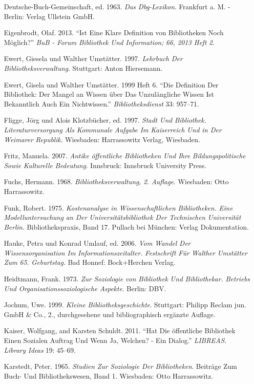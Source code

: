 \documentclass[a4paper,
fontsize=11pt,
oneside,
numbers=noperiodatend,
parskip=half-,
bibliography=totoc,
final
]{scrartcl}
\begin{document}
Deutsche-Buch-Gemeinschaft, ed. 1963. \emph{Das Dbg-Lexikon.} Frankfurt
a. M. - Berlin: Verlag Ullstein GmbH.

Eigenbrodt, Olaf. 2013. \enquote{Ist Eine Klare Definition von
Bibliotheken Noch Möglich?} \emph{BuB - Forum Bibliothek Und
Information; 66, 2013 Heft 2}.

Ewert, Giesela und Walther Umstätter. 1997. \emph{Lehrbuch Der
Bibliotheksverwaltung.} Stuttgart: Anton Hiersemann.

Ewert, Gisela und Walther Umstätter. 1999 Heft 6. \enquote{Die
Definition Der Bibliothek: Der Mangel an Wissen über Das Unzulängliche
Wissen Ist Bekanntlich Auch Ein Nichtwissen.} \emph{Bibliotheksdienst}
33: 957--71.

Fligge, Jörg und Alois Klotzbücher, ed. 1997. \emph{Stadt Und
Bibliothek. Literaturversorgung Als Kommunale Aufgabe Im Kaiserreich Und
in Der Weimarer Republik.} Wiesbaden: Harrassowitz Verlag, Wiesbaden.

Fritz, Manuela. 2007. \emph{Antike öffentliche Bibliotheken Und Ihre
Bildungspolitische Sowie Kulturelle Bedeutung.} Innsbruck: Innsbruck
University Press.

Fuchs, Hermann. 1968. \emph{Bibliotheksverwaltung, 2. Auflage}.
Wiesbaden: Otto Harrassowitz.

Funk, Robert. 1975. \emph{Kostenanalyse in Wissenschaftlichen
Bibliotheken. Eine Modelluntersuchung an Der Universitätsbibliothek Der
Technischen Universität Berlin.} Bibliothekspraxis, Band 17. Pullach bei
München: Verlag Dokumentation.

Hauke, Petra und Konrad Umlauf, ed. 2006. \emph{Vom Wandel Der
Wissensorganisation Im Informationszeitalter. Festschrift Für Walther
Umstätter Zum 65. Geburtstag.} Bad Honnef: Bock+Herchen Verlag.

Heidtmann, Frank. 1973. \emph{Zur Soziologie von Bibliothek Und
Bibliothekar. Betriebs Und Organisationssoziologische Aspekte.} Berlin:
DBV.

Jochum, Uwe. 1999. \emph{Kleine Bibliotheksgeschichte}. Stuttgart:
Philipp Reclam jun. GmbH \& Co., 2., durchgesehene und bibliographisch
ergänzte Auflage.

Kaiser, Wolfgang, and Karsten Schuldt. 2011. \enquote{Hat Die
öffentliche Bibliothek Einen Sozialen Auftrag Und Wenn Ja, Welchen? -
Ein Dialog.} \emph{LIBREAS. Library Ideas} 19: 45--69.

Karstedt, Peter. 1965. \emph{Studien Zur Soziologie Der Bibliotheken}.
Beiträge Zum Buch- Und Bibliothekswesen, Band 1. Wiesbaden: Otto
Harrassowitz.
\end{document}
